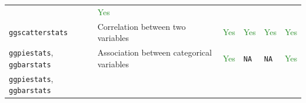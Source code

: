 \documentclass[
]{article}
\begin{document}
\begin{longtable}[]{@{}llllll@{}}
\begin{minipage}[t]{0.08\columnwidth}
\end{minipage} & \begin{minipage}[t]{0.10\columnwidth}\raggedright
\textcolor{ForestGreen}{Yes}\strut
\end{minipage}\tabularnewline
\begin{minipage}[t]{0.14\columnwidth}\raggedright
\texttt{ggscatterstats}\strut
\end{minipage} & \begin{minipage}[t]{0.35\columnwidth}\raggedright
Correlation between two variables\strut
\end{minipage} & \begin{minipage}[t]{0.08\columnwidth}\raggedright
\textcolor{ForestGreen}{Yes}\strut
\end{minipage} & \begin{minipage}[t]{0.10\columnwidth}\raggedright
\textcolor{ForestGreen}{Yes}\strut
\end{minipage} & \begin{minipage}[t]{0.08\columnwidth}\raggedright
\textcolor{ForestGreen}{Yes}\strut
\end{minipage} & \begin{minipage}[t]{0.10\columnwidth}\raggedright
\textcolor{ForestGreen}{Yes}\strut
\end{minipage}\tabularnewline
\begin{minipage}[t]{0.14\columnwidth}\raggedright
\texttt{ggpiestats}, \texttt{ggbarstats}\strut
\end{minipage} & \begin{minipage}[t]{0.35\columnwidth}\raggedright
Association between categorical variables\strut
\end{minipage} & \begin{minipage}[t]{0.08\columnwidth}\raggedright
\textcolor{ForestGreen}{Yes}\strut
\end{minipage} & \begin{minipage}[t]{0.10\columnwidth}\raggedright
\texttt{NA}\strut
\end{minipage} & \begin{minipage}[t]{0.08\columnwidth}\raggedright
\texttt{NA}\strut
\end{minipage} & \begin{minipage}[t]{0.10\columnwidth}\raggedright
\textcolor{ForestGreen}{Yes}\strut
\end{minipage}\tabularnewline
\begin{minipage}[t]{0.14\columnwidth}\raggedright
\texttt{ggpiestats}, \texttt{ggbarstats}\strut
\end{minipage} & \begin{minipage}[t]{0.35\columnwidth}\raggedright

\end{minipage}
\end{longtable}
\end{document}
